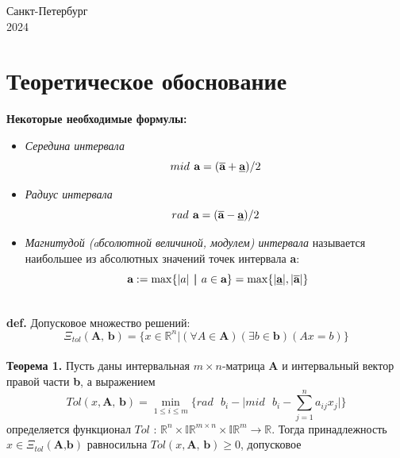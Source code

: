 \documentclass[10pt]{article}
\begin{document}
\begin{titlepage}
\vspace{\fill}

\begin{center}

Санкт-Петербург \\2024

\end{center}

\end{titlepage}

\tableofcontents\newpage

\section{Теоретическое обоснование}
\textbf{Некоторые необходимые формулы:}
\begin{itemize}
    \item \textit{Середина интервала}
    \begin{equation*}
 mid \textbf{ a}=(\overline{\textbf{a}}+\textbf{\underline{a}})/2
 \end{equation*}
    \item \textit{Радиус интервала}
    \begin{equation*}
 rad \textbf{ a}=(\overline{\textbf{a}}-\textbf{\underline{a}})/2
 \end{equation*}
    \item \textit{Магнитудой (aбсолютной величиной, модулем) интервала} называется наибольшее из абсолютных значений точек интервала \textbf{a}:
    \begin{equation*}
 \textbf{ a}:=\max\{|a|\textbf{ | } a \in \textbf{a}\}=\max\{|\textbf{\underline{a}}|, |\overline{\textbf{a}}|\}
 \end{equation*}
\end{itemize}
\\
\textbf{def.} Допусковое множество решений:
\begin{equation}\tag{1.1}
 \Xi_{tol}(\textbf{A, b})=\{x \in \mathbb{R}^n|(\forall A \in \textbf{A})(\exists b \in \textbf{b})(Ax=b)\}
 \end{equation}
\\
\textbf{Теорема 1.} Пусть даны интервальная $m \times n$-матрица \textbf{A} и интервальный вектор правой части \textbf{b}, а выражением
\begin{equation}\tag{1.2}
 Tol(x, \textbf{A, b})=\min_{1\leq i\leq m}\lbrace rad \text{ }b_i - \lvert mid \text{ }b_i - \sum_{j=1}^{n}a_{ij}x_j \rvert \rbrace 
 \end{equation}
определяется функционал $Tol$ : $\mathbb{R}^n\times\mathbb{IR}^{m\times n}\times \mathbb{IR}^m\rightarrow \mathbb{R}$. Тогда принадлежность $x \in \Xi_{tol}(\textbf{A,b})$ равносильна $Tol(x,\textbf{A, b}) \geq 0$, допусковое
\end{document}
